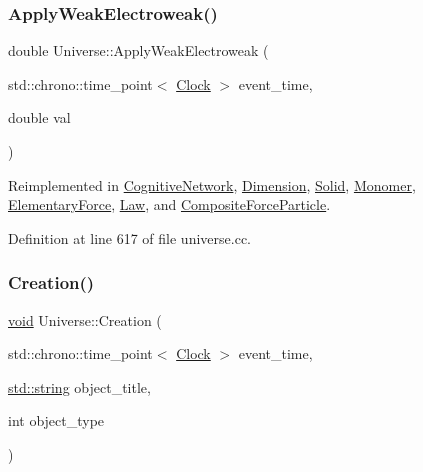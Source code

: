 \mbox{\label{class_universe_a46a906baabb63e5d31f8b48ea1fae52e}} 
\subsubsection{\texorpdfstring{Apply\+Weak\+Electroweak()}{ApplyWeakElectroweak()}}
{\footnotesize\ttfamily double Universe\+::\+Apply\+Weak\+Electroweak (\begin{DoxyParamCaption}\item[{std\+::chrono\+::time\+\_\+point$<$ \mbox{\hyperlink{universe_8h_a0ef8d951d1ca5ab3cfaf7ab4c7a6fd80}{Clock}} $>$}]{event\+\_\+time,  }\item[{double}]{val }\end{DoxyParamCaption})\hspace{0.3cm}{\ttfamily [virtual]}}



Reimplemented in \mbox{\hyperlink{class_cognitive_network_ab8bc213d2806f0dc49c1284bf934fc24}{Cognitive\+Network}}, \mbox{\hyperlink{class_dimension_abf490cabd486afa660f17940ed0d17e6}{Dimension}}, \mbox{\hyperlink{class_solid_ad6c28ec896cbcf64e24a7132a144befd}{Solid}}, \mbox{\hyperlink{class_monomer_a64f65c128ebc2428c42739c930696ea1}{Monomer}}, \mbox{\hyperlink{class_elementary_force_a2d3a5444c771f35d66d4151c62f53b12}{Elementary\+Force}}, \mbox{\hyperlink{class_law_ae8a5d1d09686d79f7814c8800791460b}{Law}}, and \mbox{\hyperlink{class_composite_force_particle_a3c1c0b427c633f0685f1d812e02b92ff}{Composite\+Force\+Particle}}.



Definition at line 617 of file universe.\+cc.

\mbox{\label{class_universe_a28615baf47d4558cbe5eebeed6575024}} 
\subsubsection{\texorpdfstring{Creation()}{Creation()}}
{\footnotesize\ttfamily \mbox{\hyperlink{glad_8h_a950fc91edb4504f62f1c577bf4727c29}{void}} Universe\+::\+Creation (\begin{DoxyParamCaption}\item[{std\+::chrono\+::time\+\_\+point$<$ \mbox{\hyperlink{universe_8h_a0ef8d951d1ca5ab3cfaf7ab4c7a6fd80}{Clock}} $>$}]{event\+\_\+time,  }\item[{\mbox{\hyperlink{glad_8h_ae84541b4f3d8e1ea24ec0f466a8c568b}{std\+::string}}}]{object\+\_\+title,  }\item[{int}]{object\+\_\+type }\end{DoxyParamCaption})}




